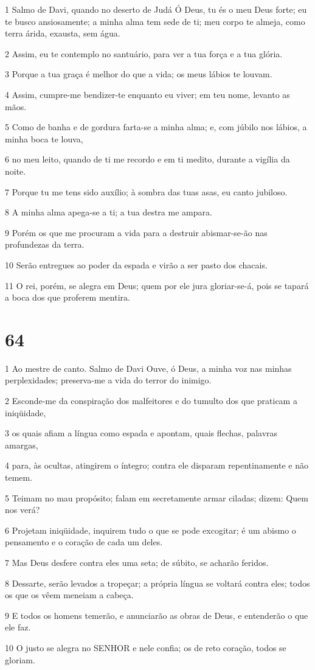 \par 1 Salmo de Davi, quando no deserto de Judá Ó Deus, tu és o meu Deus forte; eu te busco ansiosamente; a minha alma tem sede de ti; meu corpo te almeja, como terra árida, exausta, sem água.
\par 2 Assim, eu te contemplo no santuário, para ver a tua força e a tua glória.
\par 3 Porque a tua graça é melhor do que a vida; os meus lábios te louvam.
\par 4 Assim, cumpre-me bendizer-te enquanto eu viver; em teu nome, levanto as mãos.
\par 5 Como de banha e de gordura farta-se a minha alma; e, com júbilo nos lábios, a minha boca te louva,
\par 6 no meu leito, quando de ti me recordo e em ti medito, durante a vigília da noite.
\par 7 Porque tu me tens sido auxílio; à sombra das tuas asas, eu canto jubiloso.
\par 8 A minha alma apega-se a ti; a tua destra me ampara.
\par 9 Porém os que me procuram a vida para a destruir abismar-se-ão nas profundezas da terra.
\par 10 Serão entregues ao poder da espada e virão a ser pasto dos chacais.
\par 11 O rei, porém, se alegra em Deus; quem por ele jura gloriar-se-á, pois se tapará a boca dos que proferem mentira.

\chapter{64}

\par 1 Ao mestre de canto. Salmo de Davi Ouve, ó Deus, a minha voz nas minhas perplexidades; preserva-me a vida do terror do inimigo.
\par 2 Esconde-me da conspiração dos malfeitores e do tumulto dos que praticam a iniqüidade,
\par 3 os quais afiam a língua como espada e apontam, quais flechas, palavras amargas,
\par 4 para, às ocultas, atingirem o íntegro; contra ele disparam repentinamente e não temem.
\par 5 Teimam no mau propósito; falam em secretamente armar ciladas; dizem: Quem nos verá?
\par 6 Projetam iniqüidade, inquirem tudo o que se pode excogitar; é um abismo o pensamento e o coração de cada um deles.
\par 7 Mas Deus desfere contra eles uma seta; de súbito, se acharão feridos.
\par 8 Dessarte, serão levados a tropeçar; a própria língua se voltará contra eles; todos os que os vêem meneiam a cabeça.
\par 9 E todos os homens temerão, e anunciarão as obras de Deus, e entenderão o que ele faz.
\par 10 O justo se alegra no SENHOR e nele confia; os de reto coração, todos se gloriam.

